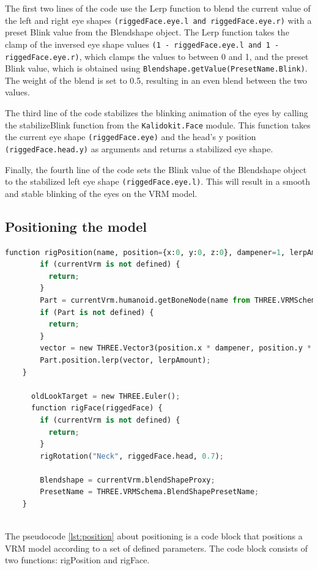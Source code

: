 The first two lines of the code use the Lerp function to blend the current value of the left and right eye shapes 
\texttt{(riggedFace.eye.l and riggedFace.eye.r)} with a preset Blink value from the Blendshape object. The Lerp 
function takes the clamp of the inversed eye shape values \texttt{(1 - riggedFace.eye.l and 1 - riggedFace.eye.r)}, 
which clamps the values to between 0 and 1, and the preset Blink value, which is obtained using \texttt{Blendshape.getValue(PresetName.Blink)}. 
The weight of the blend is set to 0.5, resulting in an even blend between the two values.

The third line of the code stabilizes the blinking animation of the eyes by calling 
the stabilizeBlink function from the \texttt{Kalidokit.Face} module. This function takes the 
current eye shape \texttt{(riggedFace.eye)} and the head's y position \texttt{(riggedFace.head.y)}  as arguments 
and returns a stabilized eye shape.

Finally, the fourth line of the code sets the Blink value of the Blendshape object to the 
stabilized left eye shape \texttt{(riggedFace.eye.l)}. This will result in a smooth and stable blinking  
of the eyes on the VRM model.

\subsection{Positioning the model}

\begin{lstlisting}[language=Python,caption=Position of the model,label=lst:position]
    function rigPosition(name, position={x:0, y:0, z:0}, dampener=1, lerpAmount=0.3) {
        if (currentVrm is not defined) {
          return;
        }
        Part = currentVrm.humanoid.getBoneNode(name from THREE.VRMSchema.HumanoidBoneName);
        if (Part is not defined) {
          return;
        }
        vector = new THREE.Vector3(position.x * dampener, position.y * dampener, position.z * dampener);
        Part.position.lerp(vector, lerpAmount);
    }
      
      oldLookTarget = new THREE.Euler();
      function rigFace(riggedFace) {
        if (currentVrm is not defined) {
          return;
        }
        rigRotation("Neck", riggedFace.head, 0.7);
      
        Blendshape = currentVrm.blendShapeProxy;
        PresetName = THREE.VRMSchema.BlendShapePresetName;
    }
      

\end{lstlisting}
The pseudocode \ref{lst:position} about positioning is a code block that positions a VRM model according to a set of defined parameters. 
The code block consists of two functions: rigPosition and rigFace.

